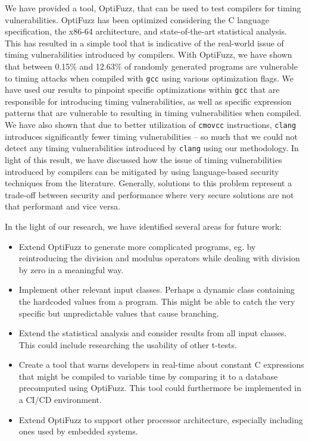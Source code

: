 
We have provided a tool, OptiFuzz, that can be used to test compilers for timing vulnerabilities.
OptiFuzz has been optimized considering the C language specification, the x86-64 architecture, and state-of-the-art statistical analysis.
This has resulted in a simple tool that is indicative of the real-world issue of timing vulnerabilities introduced by compilers.
With OptiFuzz, we have shown that between 0.15\% and 12.63\% of randomly generated programs are vulnerable to timing attacks when compiled with \texttt{gcc} using various optimization flags.
We have used our results to pinpoint specific optimizations within \texttt{gcc} that are responsible for introducing timing vulnerabilities, as well as specific expression patterns that are vulnerable to resulting in timing vulnerabilities when compiled.
We have also shown that due to better utilization of \texttt{cmovcc} instructions, \texttt{clang} introduces significantly fewer timing vulnerabilities -- so much that we could not detect any timing vulnerabilities introduced by \texttt{clang} using our methodology.
In light of this result, we have discussed how the issue of timing vulnerabilities introduced by compilers can be mitigated by using language-based security techniques from the literature.
Generally, solutions to this problem represent a trade-off between security and performance where very secure solutions are not that performant and vice versa.

In the light of our research, we have identified several areas for future work:
\begin{itemize}
    \setlength\itemsep{-0.6em}
    \item Extend OptiFuzz to generate more complicated programs, eg. by reintroducing the division and modulus operators while dealing with division by zero in a meaningful way.
    \item Implement other relevant input classes. Perhaps a dynamic class containing the hardcoded values from a program. This might be able to catch the very specific but unpredictable values that cause branching.
    \item Extend the statistical analysis and consider results from all input classes. This could include researching the usability of other t-tests.
    \item Create a tool that warns developers in real-time about constant C expressions that might be compiled to variable time by comparing it to a database precomputed using OptiFuzz. This tool could furthermore be implemented in a CI/CD environment.
    \item Extend OptiFuzz to support other processor architecture, especially including ones used by embedded systems.
\end{itemize}